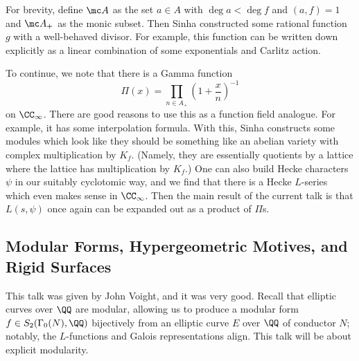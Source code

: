 \documentclass{article}
\begin{document}
For brevity, define $\mc A$ as the set $a\in A$ with $\deg a<\deg f$ and $(a,f)=1$ and $\mc A_+$ as the monic subset. Then Sinha constructed some rational function $g$ with a well-behaved divisor. For example, this function can be written down explicitly as a linear combination of some exponentials and Carlitz action.

To continue, we note that there is a Gamma function
\[\Pi(x)=\prod_{n\in A_+}\left(1+\frac xn\right)^{-1}\]
on $\CC_\infty$. There are good reasons to use this as a function field analogue. For example, it has some interpolation formula. With this, Sinha constructs some modules which look like they should be something like an abelian variety with complex multiplication by $K_f$. (Namely, they are essentially quotients by a lattice where the lattice has multiplication by $K_f$.) One can also build Hecke characters $\psi$ in our suitably cyclotomic way, and we find that there is a Hecke $L$-series which even makes sense in $\CC_\infty$. Then the main result of the current talk is that $L(s,\psi)$ once again can be expanded out as a product of $\Pi$s.

\subsection{Modular Forms, Hypergeometric Motives, and Rigid Surfaces}
This talk was given by John Voight, and it was very good. Recall that elliptic curves over $\QQ$ are modular, allowing us to produce a modular form $f\in S_2(\Gamma_0(N),\QQ)$ bijectively from an elliptic curve $E$ over $\QQ$ of conductor $N$; notably, the $L$-functions and Galois representations align. This talk will be about explicit modularity.
\end{document}
